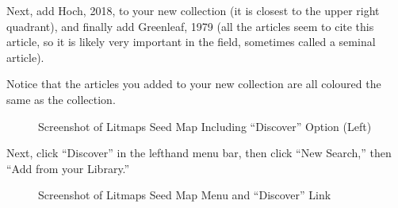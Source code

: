\documentclass[
  letterpaper,
  DIV=11,
  numbers=noendperiod]{scrreprt}
\begin{document}
Next, add Hoch, 2018, to your new collection (it is closest to the upper
right quadrant), and finally add Greenleaf, 1979 (all the articles seem
to cite this article, so it is likely very important in the field,
sometimes called a seminal article).

Notice that the articles you added to your new collection are all
coloured the same as the collection.

\begin{figure}

\caption{\label{fig-litmaps4}Screenshot of Litmaps Seed Map Including
``Discover'' Option (Left)}


\end{figure}%

Next, click ``Discover'' in the lefthand menu bar, then click ``New
Search,'' then ``Add from your Library.''

\begin{figure}

\caption{\label{fig-litmaps5}Screenshot of Litmaps Seed Map Menu and
``Discover'' Link}


\end{figure}%
\end{document}
